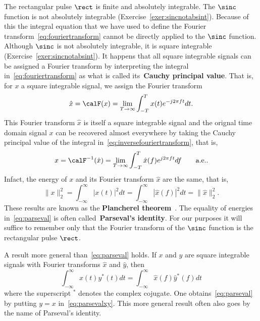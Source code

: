 \documentclass[11pt,a4paper]{book}
\theoremstyle{plain}
\numberwithin{equation}{section}
\newcommand{\term}{\textbf}
\newcommand{\abs}[1]{\left\vert #1 \right\vert}
\begin{document}
The rectangular pulse $\rect$ is finite and absolutely integrable.  The $\sinc$ function is not absolutely integrable (Exercise~\ref{exer:sincnotabsint}). Because of this the integral equation that we have used to define the Fourier transform~\eqref{eq:fouriertransform} cannot be directly applied to the $\sinc$ function.  %
Although $\sinc$ is not absolutely integrable, it is square integrable (Exercise~\ref{exer:sincnotabsint}).  It happens that all square integrable signals can be assigned a Fourier transform by interpreting the integral in~\eqref{eq:fouriertransform} as what is called its~\term{Cauchy principal value}.  That is, for $x$ a square integrable signal, we assign the Fourier transform
\[
\hat{x} = \calF(x) = \lim_{T \to \infty}  \int_{-T}^T x(t) e^{-j2\pi ft} dt.
\]
This Fourier transform $\hat{x}$ is itself a square integrable signal and the orignal time domain signal $x$ can be recovered almost everywhere by taking the Cauchy principal value of the integral in~\eqref{eq:inversefouriertransform}, that is,
\[
x = \calF^{-1}(\hat{x}) = \lim_{T \to \infty}  \int_{-T}^T \hat{x}(f) e^{j2\pi f t} df \qquad \text{a.e.}.
\]
Infact, the energy of $x$ and its Fourier transform $\hat{x}$ are the same, that is,
\begin{equation}\label{eq:parseval}
\|x\|_2^2 = \int_{-\infty}^{\infty} \abs{x(t)}^2 dt = \int_{-\infty}^{\infty} \abs{\hat{x}(f)}^2 dt = \|\hat{x}\|_2^2.
\end{equation}
These results are known as the \term{Plancherel theorem}~\cite[Th.~9.13]{Rudin_real_and_complex_analysis}.  The equality of energies in~\eqref{eq:parseval} is often called~\term{Parseval's identity}.  For our purposes it will suffice to remember only that the Fourier transform of the $\sinc$ function is the rectangular pulse $\rect$.
  
A result more general than~\eqref{eq:parseval} holds.  If $x$ and $y$ are square integrable signals with Fourier transforms  $\hat{x}$ and $\hat{y}$, then
\begin{equation} \label{eq:parsevalxy}
\int_{-\infty}^{\infty} x(t)y^*(t) dt = \int_{-\infty}^{\infty} \hat{x}(f)\hat{y}^*(f) dt
\end{equation}
where the superscript $^*$ denotes the complex cojugate.  One obtains~\eqref{eq:parseval} by putting $y = x$ in~\eqref{eq:parsevalxy}. This more general result often also goes by the name of Parseval's identity.
\end{document}
